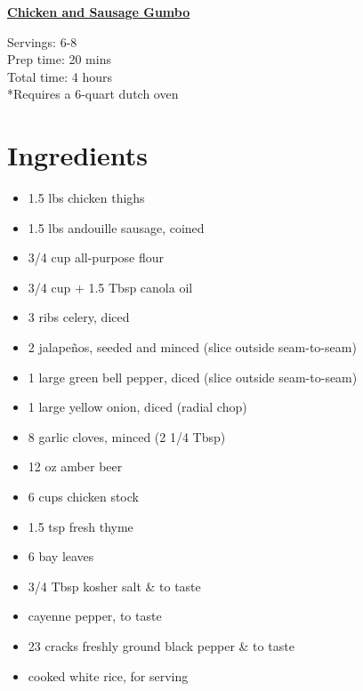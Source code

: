\documentclass[11pt]{article}
\begin{document}
	\begin{center}\begin{huge}\underline{\textbf{Chicken and Sausage Gumbo}}\end{huge}\end{center}

	Servings: 6-8\\
	Prep time: 20 mins\\
	Total time: 4 hours\\

	*Requires a 6-quart dutch oven

	\section*{Ingredients}
	\begin{itemize}
		\item 1.5 lbs chicken thighs
		\item 1.5 lbs andouille sausage, coined
		\item 3/4 cup all-purpose flour
		\item 3/4 cup + 1.5 Tbsp canola oil
		\item 3 ribs celery, diced
		\item 2 jalape\~nos, seeded and minced (slice outside seam-to-seam)
		\item 1 large green bell pepper, diced (slice outside seam-to-seam)
		\item 1 large yellow onion, diced (radial chop)
		\item 8 garlic cloves, minced (2 1/4 Tbsp)
		\item 12 oz amber beer
		\item 6 cups chicken stock
		\item 1.5 tsp fresh thyme
		\item 6 bay leaves
		\item 3/4 Tbsp kosher salt \& to taste
		\item cayenne pepper, to taste
		\item 23 cracks freshly ground black pepper \& to taste
		\item cooked white rice, for serving
	\end{itemize}
\end{document}

